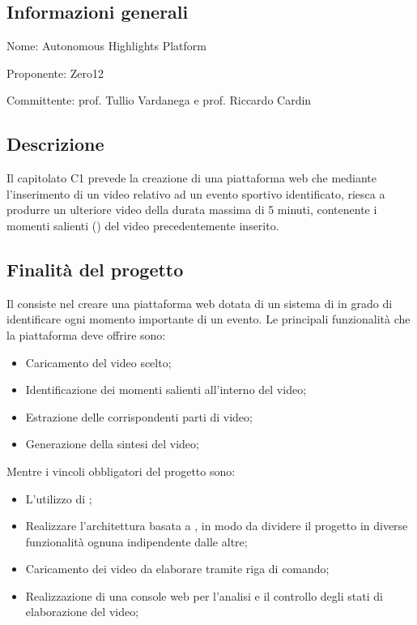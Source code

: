 \documentclass[../studio-di-fattibilita.tex]{subfiles}
\begin{document}
\subsection{Informazioni generali}%
\label{sub:informazioni_generale}
\begin{description}
  \item Nome: Autonomous Highlights Platform
  \item Proponente: Zero12
  \item Committente: prof. Tullio Vardanega e prof. Riccardo Cardin
\end{description}

\subsection{Descrizione}%
\label{sub:descrizione}
Il capitolato C1 prevede la creazione di una piattaforma web che mediante l'inserimento di un video relativo ad un evento sportivo identificato, riesca a produrre un ulteriore video della durata massima di 5 minuti, contenente i momenti salienti () del video precedentemente inserito.

\subsection{Finalità del progetto}%
\label{sub:finalita_del_progetto}
Il  consiste nel creare una piattaforma web dotata di un sistema di  in grado di identificare ogni momento importante di un evento.
Le principali funzionalità che la piattaforma deve offrire sono:
\begin{itemize}
  \item Caricamento del video scelto;
  \item Identificazione dei momenti salienti all'interno del video;
  \item Estrazione delle corrispondenti parti di video;
  \item Generazione della sintesi del video;
\end{itemize}
Mentre i vincoli obbligatori del progetto sono:
\begin{itemize}
  \item L'utilizzo di ;
  \item Realizzare l'architettura basata a , in modo da dividere il progetto in diverse funzionalità ognuna indipendente dalle altre;
  \item Caricamento dei video da elaborare tramite riga di comando;
  \item Realizzazione di una console web per l'analisi e il controllo degli stati di elaborazione del video;
\end{itemize}
\end{document}
